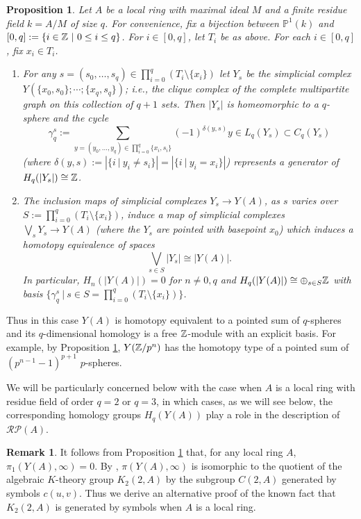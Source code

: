 \documentclass[12pt]{amsart}
\newtheorem{prop}[lem]{Proposition}
\theoremstyle{definition}
\newtheorem{rem}[lem]{Remark}
\newcommand{\Z}{\Bbb{Z}}
\newcommand{\rpb}[1]{\mathcal{RP}(#1)}%
\newcommand{\pn}[2]{\mathbb{P}^{#1}(#2)}
\newcommand{\projl}[1]{\pn{1}{#1}}
\newcommand{\<}{\langle}
\renewcommand{\>}{\rangle}
\newcommand{\card}[1]{\left| #1 \right|}
\begin{document}
\begin{prop}\label{prop:localhom} Let $A$ be a local ring with maximal ideal $M$ and a finite residue field $k=A/M$ of size $q$. 
For convenience, fix a bijection between $\projl{k}$ and $[0,q]:=\{ i\in \Z\ | \ 0\leq i\leq q\}$. For $i\in [0,q]$, let $T_i$  be as above.
For each $i\in [0,q]$, fix $x_i\in T_i$.
\begin{enumerate} 
\item For any $s=(s_0,\ldots,s_q)\in \prod_{i=0}^q (T_i\setminus\{ x_i\})$ let $Y_s$ be the simplicial complex\\
 $Y(\{ x_0,s_0\};\cdots ;\{ x_q,s_q\})$; i.e., the clique complex of the complete multipartite graph on this collection of  $q+1$ sets. Then $|Y_s|$ is homeomorphic to a $q$-sphere and the cycle
 \[
\gamma^s_q:=\sum_{y=(y_0,\ldots,y_q)\in\prod_{i=0}^q\{ x_i,s_i\}}(-1)^{\delta(y,s)}y\in  L_q(Y_s)\subset C_q(Y_s)
\]
(where $\delta(y,s):=\card{\{ i\ |\ y_i\not=s_i\}}=\card{\{ i\ |\ y_i=x_i\}}$) represents a generator of $H_q(|Y_s|)\cong \Z$.
\item The inclusion maps of simplicial complexes $Y_s\to Y(A)$, as $s$ varies over\\
 $S:=\prod_{i=0}^q (T_i\setminus\{ x_i\})$,  induce a map of simplicial complexes $\bigvee_s Y_s\to Y(A)$ 
(where the $Y_s$ are pointed with basepoint $x_0$) which induces
a homotopy equivalence of spaces
\[
\bigvee_{s\in S}|Y_s|\cong |Y(A)|.
\]
In particular, $H_n(|Y(A)|)=0$ for $n\not=0,q$ and $H_q(|Y(A)|)\cong \oplus_{s\in S} \Z$ with basis $\{ \gamma_q^s\ |\ s\in S=\prod_{i=0}^q (T_i\setminus\{ x_i\})\}$.
\end{enumerate}
\end{prop}
 Thus in this case $Y(A)$ is homotopy equivalent to a pointed sum of $q$-spheres and its $q$-dimensional homology is a free $\Z$-module with an explicit basis. For example, by Proposition \ref{prop:localhom}, $Y(\Z/p^n)$ has the homotopy type of a 
pointed sum of $(p^{n-1}-1)^{p+1}$ $p$-spheres. 

We will be particularly concerned below with the case when $A$ is a local ring 
with residue field of order $q=2$ or $q=3$, in which cases, as we will see below,  the corresponding homology groups $H_q(Y(A))$ play a role in the description of $\rpb{A}$.

\begin{rem} It follows from Proposition \ref{prop:localhom} that, for any local ring $A$, $\pi_1(Y(A),\infty)=0$. By \cite[Theorem 6.9]{hut:ge2}, $\pi(Y(A),\infty)$ is isomorphic to the quotient of the algebraic $K$-theory group $K_2(2,A)$ by the subgroup $C(2,A)$ generated by symbols $c(u,v)$. Thus we derive an alternative proof of the known fact that $K_2(2,A)$ is generated by symbols when $A$ is a local ring. 
\end{rem}
\end{document}
